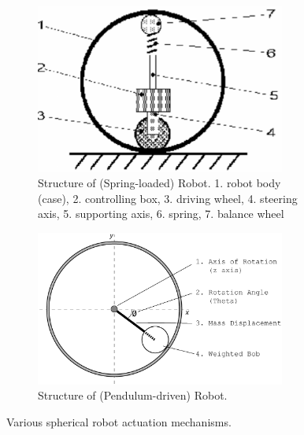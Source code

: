 \documentclass[english, bachelor, utf8]{base/thesis_telematics}
\begin{document}
\begin{figure}[ht]
    \centering
\begin{subfigure}{0.48\textwidth}
    \centering
    \includegraphics[width=0.9\textwidth]{pics/spring_2d.png}
    \caption{Structure of (Spring-loaded) Robot. 1. robot body (case), 2. controlling box, 3. driving wheel, 4. steering axis, 5. supporting axis, 6. spring, 7. balance wheel~\cite{old_spring_paper}}
    \label{fig:spring_2D_top}
\end{subfigure}

\begin{subfigure}{0.48\textwidth}
    \centering
    \includegraphics[width=0.9\textwidth]{pics/pendulum_mechanism.png}
    \caption{Structure of (Pendulum-driven) Robot.}
    \label{fig:pendulum_2D}
\end{subfigure}


\caption{Various spherical robot actuation mechanisms.}
\label{fig:spring_sphere}
\end{figure}
\end{document}

